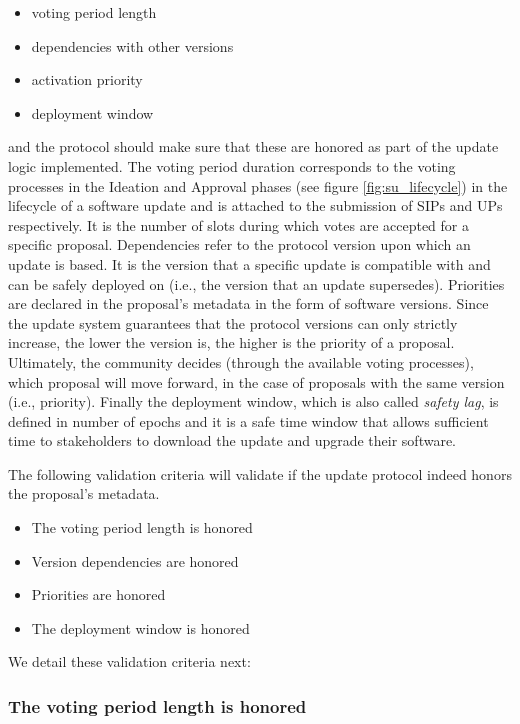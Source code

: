 \begin{itemize}
	\item voting period length
	\item dependencies with other versions
	\item activation priority
	\item deployment window
\end{itemize}

and the protocol should make sure that these are honored as part of the update
logic implemented. The voting period duration corresponds to the voting
processes in the Ideation and Approval phases (see figure
\ref{fig:su_lifecycle}) in the lifecycle of a software update and is attached
to the submission of SIPs and UPs respectively. It is the number of slots
during which votes are accepted for a specific proposal. Dependencies refer to
the protocol version upon which an update is based. It is the version that a
specific update is compatible with and can be safely deployed on (i.e., the
version that an update supersedes). Priorities are declared in the proposal's
metadata in the form of software versions. Since the update system guarantees
that the protocol versions can only strictly increase, the lower the version
is, the higher is the priority of a proposal. Ultimately, the community
decides (through the available voting processes), which proposal will move
forward, in the case of proposals with the same version (i.e., priority).
Finally the deployment window, which is also called \emph{safety lag}, is
defined in number of epochs and it is a safe time window that allows sufficient
time to stakeholders to download the update and upgrade their software.

The following validation criteria will validate if the update protocol
indeed honors the proposal's metadata.
\begin{itemize}
	\item The voting period length is honored
	\item Version dependencies are honored
	\item Priorities are honored
	\item The deployment window is honored
\end{itemize}
We detail these validation criteria next:

\subsubsection{The voting period length is honored}
\label{vc:The_voting_period_length_is_honored}

